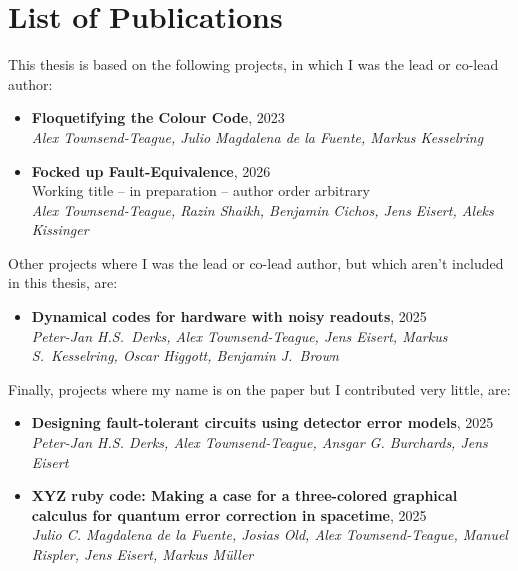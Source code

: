 \chapter*{List of Publications}
This thesis is based on the following projects, in which I was the lead or co-lead author:
\begin{itemize}
    \item \textbf{Floquetifying the Colour Code}, 2023~\cite{Townsend_Teague_2023}
    \\ \textit{Alex Townsend-Teague, Julio Magdalena de la Fuente, Markus Kesselring}
    \item \textbf{Focked up Fault-Equivalence}, 2026~\cite{townsendteague2026fockedup}
    \\ Working title -- in preparation -- author order arbitrary
    \\ \textit{Alex Townsend-Teague, Razin Shaikh, Benjamin Cichos, Jens Eisert, Aleks Kissinger}
\end{itemize}
Other projects where I was the lead or co-lead author, but which aren't included in this thesis, are:
\begin{itemize}
    \item \textbf{Dynamical codes for hardware with noisy readouts}, 2025~\cite{derks2025dynamicalcodeshardwarenoisy}
    \\ \textit{Peter-Jan H.S.\ Derks, Alex Townsend-Teague, Jens Eisert, Markus S.\ Kesselring, Oscar Higgott, Benjamin J.\ Brown}
\end{itemize}
Finally, projects where my name is on the paper but I contributed very little, are:
\begin{itemize}
    \item \textbf{Designing fault-tolerant circuits using detector error models}, 2025~\cite{Derks_2025}
    \\ \textit{Peter-Jan H.S. Derks, Alex Townsend-Teague, Ansgar G. Burchards, Jens Eisert}
    \item \textbf{XYZ ruby code: Making a case for a three-colored graphical calculus for quantum error correction in spacetime}, 2025~\cite{Magdalena_de_la_Fuente_2025}
    \\ \textit{Julio C. Magdalena de la Fuente, Josias Old, Alex Townsend-Teague, Manuel Rispler, Jens Eisert, Markus Müller}
\end{itemize}